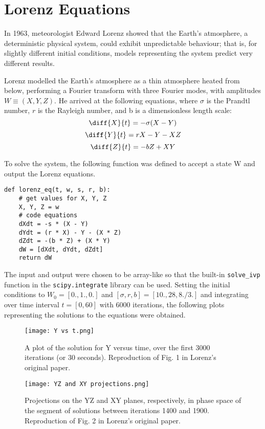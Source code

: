 \documentclass[12pt,a4paper]{article}
\begin{document}
\section{Lorenz Equations}
In 1963, meteorologist Edward Lorenz showed that the Earth's atmosphere, a deterministic physical system, could exhibit unpredictable behaviour; that is, for slightly different initial conditions, models representing the system predict very different results.

Lorenz modelled the Earth's atmosphere as a thin atmosphere heated from below, performing a Fourier transform with three Fourier modes, with amplitudes $W \equiv (X, Y, Z)$. He arrived at the following equations, where $\sigma$ is the Prandtl number, $r$ is the Rayleigh number, and b is a dimensionless length scale:
\[\diff{X}{t} = -\sigma(X - Y)\]
\[\diff{Y}{t} = rX - Y - XZ\]
\[\diff{Z}{t} = -bZ + XY\]

To solve the system, the following function was defined to accept a state W and output the Lorenz equations.

\begin{verbatim}
def lorenz_eq(t, w, s, r, b):
    # get values for X, Y, Z
    X, Y, Z = w
    # code equations
    dXdt = -s * (X - Y)
    dYdt = (r * X) - Y - (X * Z)
    dZdt = -(b * Z) + (X * Y)
    dW = [dXdt, dYdt, dZdt]
    return dW
\end{verbatim}

The input and output were chosen to be array-like so that the built-in \verb|solve_ivp| function in the \verb|scipy.integrate| library can be used. Setting the initial conditions to $W_0 = [0., 1., 0.]$ and $[\sigma, r, b] = [10., 28, 8./3.]$ and integrating over time interval $t = [0, 60]$ with 6000 iterations, the following plots representing the solutions to the equations were obtained.

\begin{figure}[htbp!]
\begin{center}
\texttt{[image: Y vs t.png]}
\end{center}
\caption{A plot of the solution for Y versus time, over the first 3000 iterations (or 30 seconds). Reproduction of Fig. 1 in Lorenz's original paper.}
\label{fig:Ygraph}
\end{figure}

\begin{figure}[htbp!]
\begin{center}
\texttt{[image: YZ and XY projections.png]}
\end{center}
\caption{Projections on the YZ and XY planes, respectively, in phase space of the segment of solutions between iterations 1400 and 1900. Reproduction of Fig. 2 in Lorenz's original paper.}
\label{fig:projections}
\end{figure}
\end{document}
